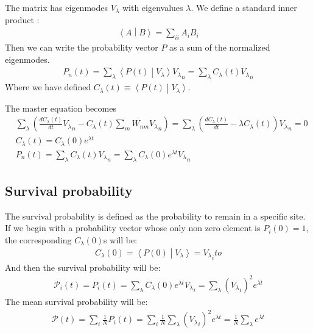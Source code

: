 \documentclass[onecolumn,fleqn]{revtex4}
\newcommand{\inner}[2]{\left \langle #1 \middle| #2\right\rangle} %
\begin{document}
The matrix has eigenmodes $V_\lambda$ with eigenvalues $\lambda$. 
We define a standard inner product :
\begin{align}
\inner{A}{B} = \sum_{ii} A_iB_i
\end{align}
Then we can write the probability vector $P$ as a sum of the normalized eigenmodes.
\begin{align}
P_n(t) = \sum_\lambda \inner{P(t)}{V_\lambda}{V_\lambda }_n = \sum_\lambda C_\lambda(t) {V_\lambda}_n
\end{align}
Where we have defined $C_\lambda(t)\equiv \inner{P(t)}{V_\lambda}$.


The master equation becomes
\begin{align}
&\sum_\lambda \left( \frac{dC_\lambda(t)}{dt}{V_\lambda}_n - C_\lambda(t)\sum_m W_{nm}{V_\lambda}_n \right)= \sum_\lambda \left( \frac{dC_\lambda(t)}{dt} - \lambda C_\lambda(t)\right){V_\lambda}_n =0\\
&C_\lambda(t) = C_\lambda(0)e^{\lambda t}\\
&P_n(t) = \sum_\lambda C_\lambda(t) {V_\lambda}_n = \sum_\lambda  C_\lambda(0)e^{\lambda t} {V_\lambda}_n 
\end{align}
\subsection{Survival probability}
The survival probability is defined as the probability to remain in a specific site. If we begin with a probability vector whose only non zero element is $P_i(0)=1$, the corresponding $C_\lambda(0)$s will be:
\begin{align}
C_\lambda(0) = \inner{P(0)}{V_\lambda}= {V_\lambda}_ito
\end{align}
And then the survival probability will be:
\begin{align}
\mathcal{P}_i(t) = P_i(t) = \sum_\lambda  C_\lambda(0)e^{\lambda t} {V_\lambda}_i=\sum_\lambda ({V_\lambda}_i)^2 e^{\lambda t} 
\end{align}
The mean survival probability will be:
\begin{align} \label{eq:surv_eigenvalues}
\mathcal{P}(t) = \sum_i \frac{1}{N} P_i(t)=\sum_i \frac{1}{N} \sum_\lambda ({V_\lambda}_i)^2 e^{\lambda t}  =\frac{1}{N}\sum_\lambda e^{\lambda t}
\end{align}
\end{document}
